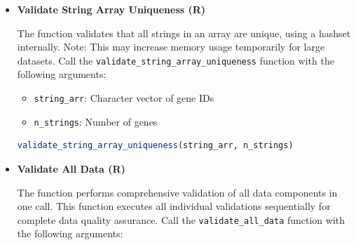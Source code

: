 \documentclass[11pt]{article}
\begin{document}
\begin{enumerate}
\begin{itemize}
\begin{itemize}
	      	      	\item \texttt{gene\_to\_fam}: Integer vector mapping each gene to its family
	      	      	      index
	      	      	      
	      	      	\item \texttt{n\_samples}: Number of samples
	      	      \end{itemize}
	      	      
	      	      \begin{lstlisting}[language=R, caption={R Validate Shift Vectors}]
validate_shift_vectors(shift_vectors, expression_vectors, 
    family_centroids, gene_to_fam, n_samples)
	      	      \end{lstlisting}
	      	      
	      	\item \textbf{Validate String Array Uniqueness (R)}
	      	      
	      	      The function validates that all strings in an array are unique, using a
	      	      hashset internally. Note: This may increase memory usage temporarily for
	      	      large datasets. Call the \texttt{validate\_string\_array\_uniqueness}
	      	      function with the following arguments:
	      	      
	      	      \begin{itemize}
	      	      	\item \texttt{string\_arr}: Character vector of gene IDs
	      	      	      
	      	      	\item \texttt{n\_strings}: Number of genes
	      	      \end{itemize}
	      	      
	      	      \begin{lstlisting}[language=R, caption={R Validate String Array Uniqueness}]
validate_string_array_uniqueness(string_arr, n_strings)
	      	      \end{lstlisting}
	      	      
	      	\item \textbf{Validate All Data (R)}
	      	      
	      	      The function performs comprehensive validation of all data components in one
	      	      call. This function executes all individual validations sequentially for
	      	      complete data quality assurance. Call the \texttt{validate\_all\_data}
	      	      function with the following arguments:
	      	      

\end{itemize}
\end{enumerate}
\end{document}

